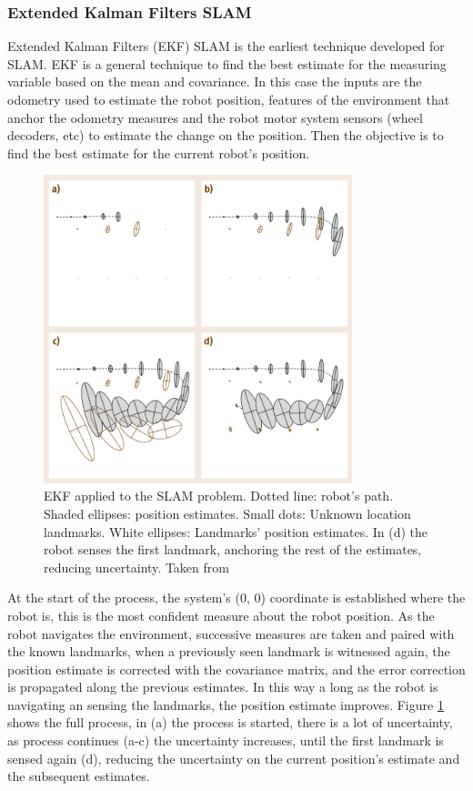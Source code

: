     \subsubsection{Extended Kalman Filters SLAM} \label{ch_3:sect:localization:ekf}

      Extended Kalman Filters (EKF) SLAM is the earliest technique developed for SLAM. EKF is a general technique to find the best estimate for the measuring variable based on the mean and covariance. In this case the inputs are the odometry used to estimate the robot position, features of the environment that anchor the odometry measures and the robot motor system sensors (wheel decoders, etc) to estimate the change on the position. Then the objective is to find the best estimate for the current robot's position.

      \begin{figure}[!h]
        \centering
        \includegraphics[width=0.8\textwidth]{./Figures/slam_ekf_model.png}
        \caption{EKF applied to the SLAM problem. Dotted line: robot's path. Shaded ellipses: position estimates. Small dots: Unknown location landmarks. White ellipses: Landmarks' position estimates. In (d) the robot senses the first landmark, anchoring the rest of the estimates, reducing uncertainty. Taken from \cite{inbookhandbook}}
        \label{ch_3:fig:ekf_slam}
      \end{figure}

      At the start of the process, the system's ($0$, $0$) coordinate is established where the robot is, this is the most confident measure about the robot position. As the robot navigates the environment, successive measures are taken and paired with the known landmarks, when a previously seen landmark is witnessed again, the position estimate is corrected with the covariance matrix, and the error correction is propagated along the previous estimates. In this way a long as the robot is navigating an sensing the landmarks, the position estimate improves. Figure \ref{ch_3:fig:ekf_slam} shows the full process, in (a) the process is started, there is a lot of uncertainty, as process continues (a-c) the uncertainty increases, until the first landmark is sensed again (d), reducing the uncertainty on the current position's estimate and the subsequent estimates.

